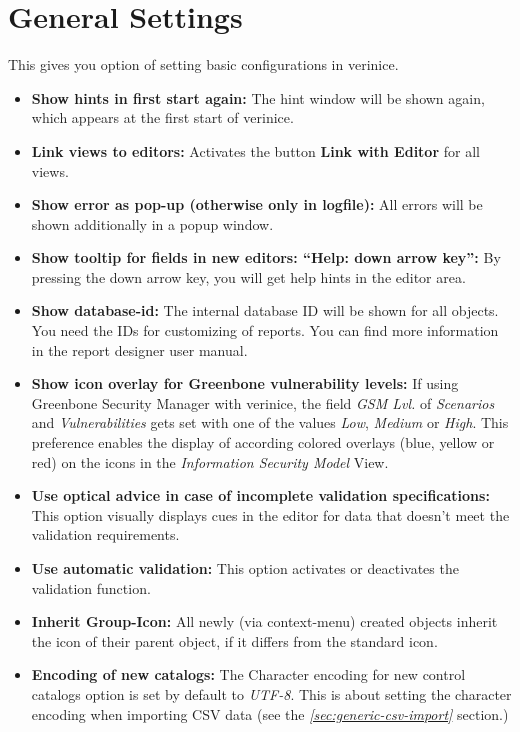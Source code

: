 \documentclass[a4paper,10pt]{book}
\begin{document}
\section{General Settings}
This gives you option of setting basic configurations in verinice.
\begin{itemize}
\item \textbf{Show hints in first start again:}
   The hint window will be shown again, which appears at the first start of verinice.
\item \textbf{Link views to editors:}
   Activates the button \textbf{Link with Editor} for all views.
\item \textbf{Show error as pop-up (otherwise only in logfile):}
   All errors will be shown additionally in a popup window.
\item \textbf{Show tooltip for fields in new editors: ``Help: down arrow key'':}
   By pressing the down arrow key, you will get help hints in the editor area.
\item \textbf{Show database-id:}
   The internal database ID will be shown for all objects. You need the IDs for customizing of reports. You can find more information in the report designer user manual.
\item \textbf{Show icon overlay for Greenbone vulnerability levels:} If using
  Greenbone Security Manager with verinice, the field {\em GSM Lvl.} of
  {\em Scenarios} and {\em Vulnerabilities} gets set with one of the values
  {\em Low}, {\em Medium} or {\em High}. This preference enables the display
  of according colored overlays (blue, yellow or red) on the
  icons in the {\em Information Security Model} View.
\item \textbf{Use optical advice in case of incomplete validation specifications:}
   This option visually displays cues in the editor for data that doesn't meet the validation requirements.
\item \textbf{Use automatic validation:}
   This option activates or deactivates the validation function.
\item \textbf{Inherit Group-Icon:}
   All newly (via context-menu) created objects inherit the icon of their parent object, if it differs from the standard icon.
\item \textbf{Encoding of new catalogs: }
   The Character encoding for new control catalogs option is set by default to {\em UTF-8}.
   This is about setting the character encoding when importing CSV data (see the {\em \ref{sec:generic-csv-import} } section.)

\end{itemize}
\end{document}
